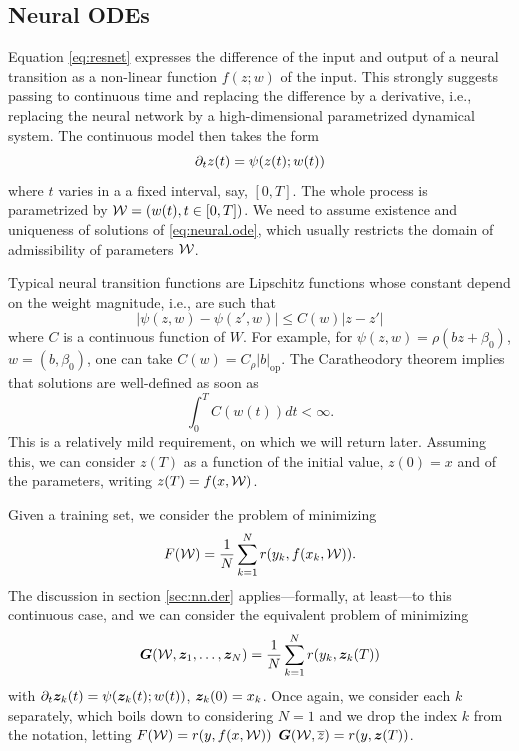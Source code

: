 \subsection{Neural ODEs}
\label{sec:neural.ode}
Equation \cref{eq:resnet} expresses the difference of the input and output of a neural transition as a non-linear function $f(z;w)$ of the input. This strongly suggests passing to continuous time and replacing the difference by a derivative, i.e., replacing the neural network by a high-dimensional parametrized dynamical system. The continuous model then takes the form \citep{chen2019neural}
\begin{equation}
\label{eq:neural.ode}
\partial_t z(t) = \psi(z(t); w(t))
\end{equation}
where $t$ varies in a a fixed interval, say, $[0,T]$. The whole process is parametrized by ${\mathcal W} = (w(t), t\in [0,T])$. We need to assume existence and uniqueness of solutions of \cref{eq:neural.ode}, which usually restricts the domain of admissibility of parameters ${\mathcal W}$.  

Typical neural transition functions are Lipschitz functions whose constant depend on the weight magnitude, i.e., are such that
\begin{equation}
\label{eq:ode.lip}
|\psi(z,w) - \psi(z', w)| \leq C(w) |z-z'|
\end{equation}
where $C$ is a continuous function of $W$. For example, for $\psi(z, w) = \rho(bz + \beta_0)$, $w = (b, \beta_0)$, one can take
$C(w) = C_\rho |b|_{\mathrm{op}}$. The Caratheodory theorem \citep{barbu2016differential} implies that solutions are well-defined as soon as 
\begin{equation}
\int_0^T C(w(t)) dt < \infty.
\label{eq:ode.carath}
\end{equation}
This is  a relatively mild requirement, on which we will return later. Assuming this, we can consider $z(T)$ as a function of the initial value, $z(0) = x$ and of the parameters, writing $z(T) = f(x, {\mathcal W})$.


Given a training set, we consider the problem of minimizing 
\begin{equation}
\label{eq:neural.ode.objective}
F({\mathcal W}) = \frac1N \sum_{k=1}^N r(y_k, f(x_k, {\mathcal W})).
\end{equation}
The discussion in section \cref{sec:nn.der} applies---formally, at least---to this continuous case, and we can consider the equivalent problem of minimizing
\[
\bm G({\mathcal W}, {\bm{z}}_1,\ldots, {\bm{z}}_N) = \frac{1}{N} \sum_{k=1}^N r(y_k, {\bm{z}}_k(T))
\]
with $\partial_t {\bm{z}}_k(t) = \psi({\bm{z}}_k(t); w(t))$, ${\bm{z}}_k(0) = x_k$. Once again, we  consider each $k$ separately, which boils down to considering $N=1$ and we drop the index $k$ from the notation, letting $F({\mathcal W}) = r(y, f(x, {\mathcal W}))$
$\bm G({\mathcal W}, {\overline{z}}) = r(y, {\bm{z}}(T))$.

